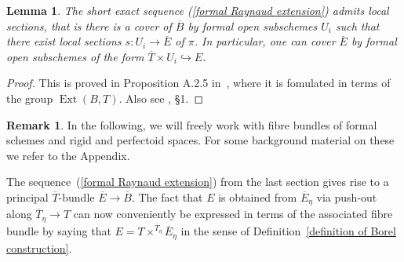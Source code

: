 \documentclass[10pt,oneside]{amsart}
\newtheorem{lemma}[theorem]{Lemma}
\theoremstyle{definition}
\newtheorem{remark}[theorem]{Remark}
\begin{document}
	\begin{lemma}\label{formal Raynaud sequence is locally split}
		The short exact sequence (\ref{formal Raynaud extension}) admits local sections, that is there is a cover of $\overline{B}$ by formal open subschemes $U_i$ such that there exist local sections $s:U_i\rightarrow \overline{E}$ of $\pi$. In particular, one can cover $\overline{E}$ by formal open subschemes of the form $\overline{T}\times U_i\hookrightarrow E$.
	\end{lemma}
	\begin{proof}
		This is proved in Proposition A.2.5 in~\cite{rigid geometry of curves}, where it is fomulated in terms of the group $\operatorname{Ext}(B,T)$. Also see \cite{BL}, \S 1.
	\end{proof}
	
	\begin{remark}
	In the following, we will freely work with fibre bundles of formal schemes and rigid and perfectoid spaces. For some background material on these we refer to the Appendix.
	\end{remark}
	
	The sequence~(\ref{formal Raynaud extension}) from the last section gives rise to a principal $\overline{T}$-bundle
	$\overline{E}\rightarrow \overline{B}$. The fact that $E$ is obtained from $\overline{E}_\eta$ via push-out along $\overline{T}_\eta\rightarrow T$ can now conveniently be expressed in terms of the associated fibre bundle by saying that $E = T\times^{\overline{T}_\eta}\overline{E}_\eta$ in the sense of Definition~\ref{definition of Borel construction}.
\end{document}
